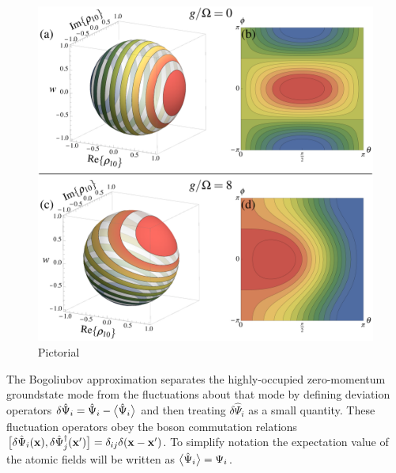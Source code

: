 \begin{figure}[hbt]
    \centering
    \includegraphics[width=14cm]{BlochSpheres}
    \caption{Pictorial \label{Peaks:BlochSphere}}
\end{figure}


The Bogoliubov approximation separates the highly-occupied zero-momentum groundstate mode from the fluctuations about that mode by defining deviation operators $\delta\hat{\Psi}_i = \hat{\Psi}_i - \big<\hat{\Psi}_i\big>$ and then treating $\delta\hat{\Psi}_i$ as a small quantity. These fluctuation operators obey the boson commutation relations $\big[\delta\hat{\Psi}_i(\mathbf{x}), \delta \hat{\Psi}_j^\dagger(\mathbf{x}')\big] = \delta_{i j} \delta(\mathbf{x}-\mathbf{x}')$. To simplify notation the expectation value of the atomic fields will be written as $\big<\hat{\Psi}_i\big> = \Psi_i$.

